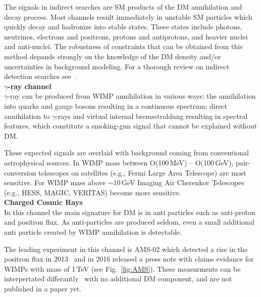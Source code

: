 The signals in indirect searches are SM products of the DM annihilation and decay process. Most channels result immediately in unstable SM particles which quickly decay and hadronize into stable states. These states include photons, neutrinos, electrons and positrons, protons and antiprotons, and heavier nuclei and anti-nuclei. The robustness of constraints that can be obtained from this method depands strongly on the knowledge of the DM density and/or uncertainties in background modeling. For a thorough review on indirect detection searches see~\cite{Conrad:2014tla}.\\

	\textbf{$\gamma$-ray channel}\\

$\gamma$-ray can be produced from WIMP annihilation in various ways: the annihilation into quarks and gauge bosons resulting in a continuous spectrum; direct annihilation to $\gamma$-rays and virtual internal bremsstrahlung resulting in spectral features, which constitute a smoking-gun signal that cannot be explained without DM.

These expected signals are overlaid with background coming from conventional astrophysical sources. In WIMP mass between O(100\,MeV) -- O(100\,GeV), pair-conversion telescopes on satellites (e.g., Fermi Large Area Telescope) are most sensitive. For WIMP mass above $\sim 10$\,GeV Imaging Air Cherenkov Telescopes (e.g., HESS, MAGIC, VERITAS) become more sensitive.\\

\textbf{Charged Cosmic Rays}\\

In this channel the main signature for DM is in anti particles such as anti-proton and positron flux. As anti-particles are produced seldom, even a small additional anti particle created by WIMP annihilation is detectable.

The leading experiment in this channel is AMS-02 which detected a rise in the positron flux in 2013~\cite{Aguilar:2013qda} and in 2016 released a press note with claims evidance for WIMPs with mass of 1\,TeV (see Fig.~\ref{fig:AMS}). These measurments can be interpertated differantly~\cite{Blum:2013zsa} with no additional DM component, and are not published in a paper yet. \\

